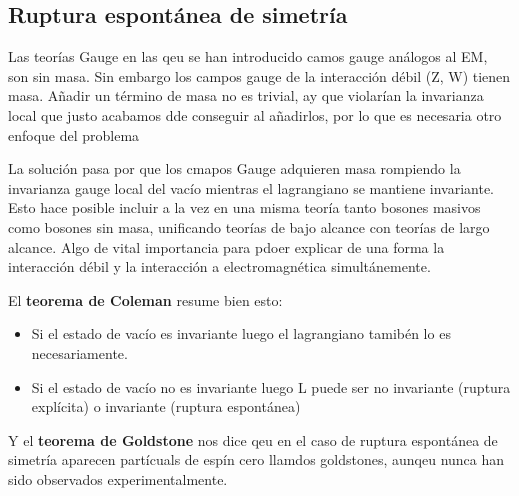 \subsection{Ruptura espontánea de simetría}

Las teorías Gauge en las qeu se han introducido camos gauge análogos al EM, son sin masa. Sin embargo los campos gauge de la interacción débil (Z, W) tienen masa. Añadir un término de masa no es trivial, ay que violarían la invarianza local que justo acabamos dde conseguir al añadirlos, por lo que es necesaria otro enfoque del problema

La solución pasa por que los cmapos Gauge adquieren masa rompiendo la invarianza gauge local del vacío mientras el lagrangiano se mantiene invariante. Esto hace posible incluir a la vez en una misma teoría tanto bosones masivos como bosones sin masa, unificando teorías de bajo alcance con teorías de largo alcance. Algo de vital importancia para pdoer explicar de una forma la interacción débil y la interacción a electromagnética simultánemente. 

El \textbf{teorema de Coleman} resume bien esto: 

\begin{itemize}
    \item Si el estado de vacío es invariante luego el lagrangiano tamibén lo es necesariamente. 
    \item Si el estado de vacío no es invariante luego L puede ser no invariante (ruptura explícita) o invariante (ruptura espontánea)
\end{itemize}
Y el \textbf{teorema de Goldstone} nos dice qeu en el caso de ruptura espontánea de simetría aparecen partícuals de espín cero llamdos goldstones, aunqeu nunca han sido observados experimentalmente. 